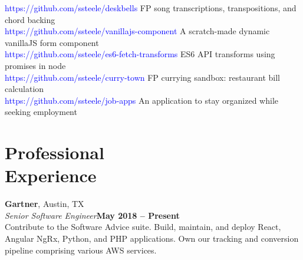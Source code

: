 \documentclass[margin,line]{resume}
\begin{document}
\begin{resume}
\textcolor{blue}{https://github.com/ssteele/deskbells} FP song transcriptions, transpositions, and chord backing\vspace{0.3mm}\\
\textcolor{blue}{https://github.com/ssteele/vanillajs-component} A scratch-made dynamic vanillaJS form component\vspace{0.3mm}\\
\textcolor{blue}{https://github.com/ssteele/es6-fetch-transforms} ES6 API transforms using promises in node\vspace{0.3mm}\\
\textcolor{blue}{https://github.com/ssteele/curry-town} FP currying sandbox: restaurant bill calculation\vspace{0.3mm}\\
\textcolor{blue}{https://github.com/ssteele/job-apps} An application to stay organized while seeking employment\vspace{0.3mm}



\section{\mysidestyle Professional\\Experience}

\textbf{Gartner}, Austin, TX
\vspace{2mm}\\
\textsl{Senior Software Engineer}\hfill \textbf{May 2018 -- Present}\vspace{1mm}\\
Contribute to the Software Advice suite. Build, maintain, and deploy React, Angular NgRx, Python, and PHP applications. Own our tracking and conversion pipeline comprising various AWS services.


\end{resume}
\end{document}
